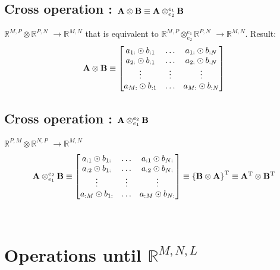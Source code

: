 \documentclass[11pt]{article}
\newcommand{\transpose}{\mathrm{T}}
\newcommand{\MATRIX}[1]{\mathbf{\uppercase{#1}}}
\newcommand{\mulinner}{\odot}
\newcommand{\mulcross}{\otimes}
\newcommand{\dimsep}{,}
\newcommand{\mulcrossxy}{\mulcross_{e_1}^{e_2}}
\newcommand{\mulcrossyx}{\mulcross_{e_2}^{e_1}}
\begin{document}
\subsection{Cross operation : $\MATRIX{A}\mulcross \MATRIX{B}\equiv \MATRIX{A}\mulcrossyx \MATRIX{B}$}
$\mathbb{R}^{M\dimsep P}\mulcross \mathbb{R}^{P\dimsep N}$ $\rightarrow \mathbb{R}^{M\dimsep N}$
that is equivalent to
$\mathbb{R}^{M\dimsep P}\mulcrossyx \mathbb{R}^{P\dimsep N}$ $\rightarrow \mathbb{R}^{M\dimsep N}$.
Result: 
  \begin{equation}
\MATRIX{A}\mulcross \MATRIX{B}
 \equiv \left[
 \begin{matrix}
 a_{1:}\mulinner b_{:1} &\hdots &a_{1:}\mulinner b_{:N}\\ 
 a_{2:}\mulinner b_{:1} &\hdots &a_{2:}\mulinner b_{:N}\\
 \vdots &\vdots &\vdots\\ 
 a_{M:}\mulinner b_{:1} &\hdots &a_{M:}\mulinner b_{:N}\\ 
 \end{matrix}
 \right]
  \end{equation}

\subsection{Cross operation : $\MATRIX{A}\mulcrossxy \MATRIX{B}$}
$\mathbb{R}^{P\dimsep M}\mulcross \mathbb{R}^{N\dimsep P}$ $\rightarrow \mathbb{R}^{M\dimsep N}$
  \begin{equation}
\MATRIX{A}\mulcrossxy \MATRIX{B}
 \equiv \left[
 \begin{matrix}
 a_{:1}\mulinner b_{1:} &\hdots &a_{:1}\mulinner b_{N:}\\ 
 a_{:2}\mulinner b_{1:} &\hdots &a_{:2}\mulinner b_{N:}\\
 \vdots &\vdots &\vdots\\ 
 a_{:M}\mulinner b_{1:} &\hdots &a_{:M}\mulinner b_{N:}\\ 
 \end{matrix}
 \right] \equiv \left \{\MATRIX{B}\mulcross \MATRIX{A} \right \}^{\transpose}
\equiv \MATRIX{A}^{\transpose}\mulcross \MATRIX{B}^{\transpose}
 \end{equation}
  
\newpage\
\section{Operations until $\mathbb{R}^{M \dimsep N \dimsep L}$}
\end{document}
